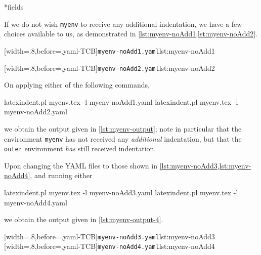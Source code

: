 \documentclass[10pt]{article}
\begin{document}
*{fields}
 \begin{example}
 If we do not wish \texttt{myenv} to receive any additional indentation, we have a few
 choices available to us, as demonstrated in \cref{lst:myenv-noAdd1,lst:myenv-noAdd2}.

 \begin{minipage}{.45\textwidth}
  [width=.8\linewidth,before=\centering,yaml-TCB]{\texttt{myenv-noAdd1.yaml}}{lst:myenv-noAdd1}
 \end{minipage}
 \hfill
 \begin{minipage}{.45\textwidth}
  [width=.8\linewidth,before=\centering,yaml-TCB]{\texttt{myenv-noAdd2.yaml}}{lst:myenv-noAdd2}
 \end{minipage}

 On applying either of the following commands, 

 \begin{commandshell}
latexindent.pl myenv.tex -l myenv-noAdd1.yaml  
latexindent.pl myenv.tex -l myenv-noAdd2.yaml  
\end{commandshell}

 we obtain the output given in \cref{lst:myenv-output}; note in particular that the
 environment \texttt{myenv} has not received any \emph{additional} indentation, but that
 the \texttt{outer} environment \emph{has} still received indentation.

 \end{example}

 \begin{example}
 Upon changing the YAML files to those shown in \cref{lst:myenv-noAdd3,lst:myenv-noAdd4},
 and running either 

 \begin{commandshell}
latexindent.pl myenv.tex -l myenv-noAdd3.yaml  
latexindent.pl myenv.tex -l myenv-noAdd4.yaml  
\end{commandshell}

 we obtain the output given in \cref{lst:myenv-output-4}.

 \begin{cmhtcbraster}
  [width=.8\linewidth,before=\centering,yaml-TCB]{\texttt{myenv-noAdd3.yaml}}{lst:myenv-noAdd3}
  [width=.8\linewidth,before=\centering,yaml-TCB]{\texttt{myenv-noAdd4.yaml}}{lst:myenv-noAdd4}
 \end{cmhtcbraster}

 \end{example}
\end{document}
